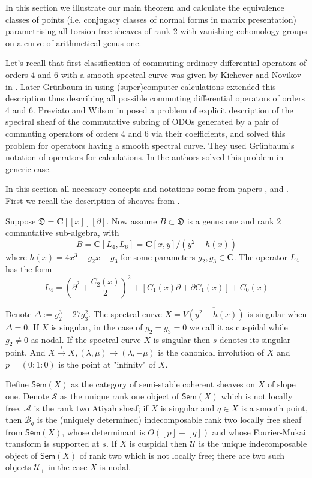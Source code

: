 \documentclass[11pt]{article}
\theoremstyle{definition}
\theoremstyle{plain}
\numberwithin{equation}{section}
\begin{document}
In this section we illustrate our main theorem and calculate the equivalence classes of points (i.e. conjugacy classes of normal forms in matrix presentation) parametrising all torsion free sheaves of rank 2 with vanishing cohomology groups on a curve of arithmetical genus one.  

Let's recall that first classification of commuting ordinary differential operators of orders 4 and 6 with a smooth spectral curve was given by Kichever and Novikov in \cite{KN}. Later Gr\"unbaum in \cite{Grun} using  (super)computer calculations extended this description thus describing all possible commuting differential operators of orders 4 and 6. Previato and Wilson in \cite{PW} posed a problem of explicit description of the spectral sheaf of the commutative subring of ODOs generated by a pair of commuting operators of orders 4 and 6 via their coefficients, and solved this problem for operators having a smooth spectral curve. They used Gr\"unbaum's notation of operators for calculations. In \cite{BZ} the authors solved this problem in generic case. 

In this section all necessary concepts and notations come from papers  \cite{Grun}, \cite{PW} and  \cite{BZ}. First we recall the description of sheaves from \cite{BZ}.

Suppose $\mathfrak{D}=\mathbf{C}[[x]][\partial]$. 
Now assume $B\subset\mathfrak{D}$ is a genus one and rank 2 commutative sub-algebra, with 
$$
B=\mathbf{C}[L_4,L_6]=\mathbf{C}[x,y]/(y^2-h(x))
$$
where $h(x)=4x^3-g_2x-g_3$ for some parameters $g_2,g_3\in \mathbf{C}$. The operator $L_4$ has the form
$$
L_4=(\partial^2+\frac{C_2(x)}{2})^2+[C_1(x)\partial+\partial C_1(x)]+C_0(x)
$$

Denote $\Delta:=g_2^3-27g_3^2$. The spectral curve $X=\overline{V(y^2-h(x))}$ is singular when $\Delta=0$. If $X$ is singular, in the case of $g_2=g_3=0$ we call it as cuspidal while $g_2\neq 0$ as nodal. If the spectral curve $X$ is singular then $s$ denotes its singular point. And $X\xrightarrow{\iota}X,(\lambda,\mu)\rightarrow(\lambda,-\mu)$ is the canonical involution of $X$ and $p=(0:1:0)$ is the  point at "infinity" of $X$.

Define $\mathsf{Sem}(X)$ as the category of semi-stable coherent sheaves on $X$ of slope one. Denote $\mathcal{S}$ as the unique rank one object of $\mathsf{Sem}(X)$ which is not locally free. $\mathcal{A}$ is the rank two Atiyah sheaf; if $X$ is singular and $q\in X$ is a smooth point, then $\mathcal{B}_q$ is the (uniquely determined) indecomposable rank two locally free sheaf from $\mathsf{Sem}(X)$, whose determinant is $O([p]+[q])$ and whose Fourier-Mukai transform is supported at $s$. If $X$ is cuspidal then $\mathcal{U}$ is the unique indecomposable object of $\mathsf{Sem}(X)$ of rank two which is not locally free; there are two such objects $\mathcal{U}_{\pm}$ in the case $X$ is nodal.
\end{document}
